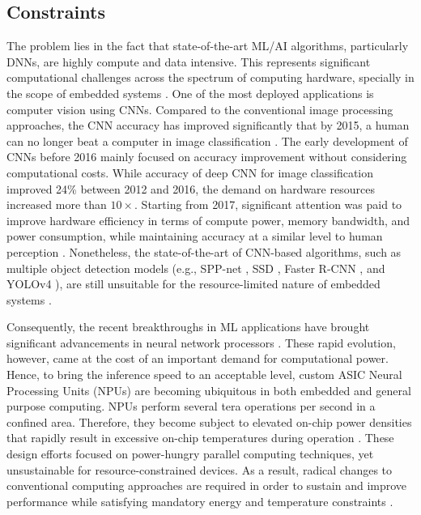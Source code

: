 \subsection{Constraints}
The problem lies in the fact that state-of-the-art ML/AI algorithms, particularly DNNs, are highly compute and data intensive. This represents significant computational challenges across the spectrum of computing hardware, specially in the scope of embedded systems \cite{venkataramani2016efficient}. One of the most deployed applications is computer vision using CNNs. Compared to the conventional image processing approaches, the CNN accuracy has improved significantly that by 2015, a human can no longer beat a computer in image classification \cite{loh20201}. The early development of CNNs before 2016 mainly focused on accuracy improvement without considering computational costs. While accuracy of deep CNN for image classification improved 24\% between 2012 and 2016, the demand on hardware resources increased more than $10\times$. Starting from 2017, significant attention was paid to improve hardware efficiency in terms of compute power, memory bandwidth, and power consumption, while maintaining accuracy at a similar level to human perception \cite{venkataramani2016efficient}. Nonetheless, the state-of-the-art of CNN-based algorithms, such as multiple object detection models (e.g., SPP-net \cite{he2015spatial}, SSD \cite{liu2016ssd}, Faster R-CNN \cite{ren2016faster}, and YOLOv4 \cite{bochkovskiy2020yolov4}), are still unsuitable for the resource-limited nature of embedded systems \cite{ahmad2020challenges, al2019artificial}.

Consequently, the recent breakthroughs in ML applications have brought significant advancements in neural network processors \cite{jouppi2017datacenter}. These rapid evolution, however, came at the cost of an important demand for computational power. Hence, to bring the inference speed to an acceptable level, custom ASIC Neural Processing Units (NPUs) are becoming ubiquitous in both embedded and general purpose computing. NPUs perform several tera operations per second in a confined area. Therefore, they become subject to elevated on-chip power densities that rapidly result in excessive on-chip temperatures during operation \cite{amrouch2020npu}.
These design efforts focused on power-hungry parallel computing techniques, yet unsustainable for resource-constrained devices.
 As a result, radical changes to conventional computing approaches are required in order to sustain and improve performance while satisfying mandatory energy and temperature constraints \cite{gillani2020exploiting}.


